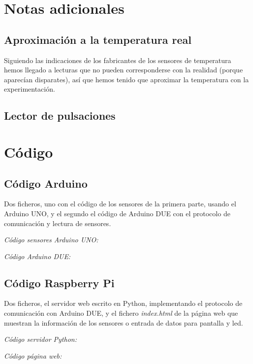 \documentclass[]{article}
\begin{document}
\section{Notas adicionales}

\subsection{Aproximación a la temperatura real}
Siguiendo las indicaciones de los fabricantes de los sensores de temperatura hemos llegado a lecturas que no pueden corresponderse con la realidad (porque aparecían disparates), así que hemos tenido que aproximar la temperatura con la experimentación.


\subsection{Lector de pulsaciones}

\section{Código}
\subsection{Código Arduino}

Dos ficheros, uno con el código de los sensores de la primera parte, usando el Arduino UNO, y el segundo el código de Arduino DUE con el protocolo de comunicación y lectura de sensores.


\textit{Código sensores Arduino UNO:}


\textit{Código Arduino DUE:}


\subsection{Código Raspberry Pi}

Dos ficheros, el servidor web escrito en Python, implementando el protocolo de comunicación con Arduino DUE, y el fichero \textit{index.html} de la página web que muestran la información de los sensores o entrada de datos para pantalla y led.

\textit{Código servidor Python:}


\textit{Código página web:}

\end{document}
